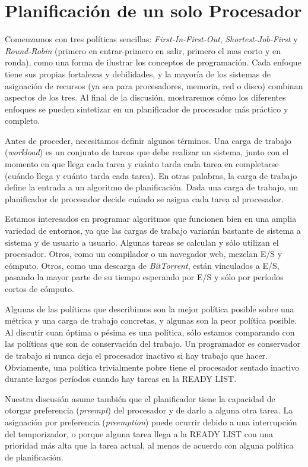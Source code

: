 \documentclass[10pt]{book}
\begin{document}
\section{Planificación de un solo Procesador}
Comenzamos con tres políticas sencillas: \textit{First-In-First-Out}, \textit{Shortest-Job-First} y \textit{Round-Robin} (primero en entrar-primero en salir, primero el mas corto y en ronda), como una forma de ilustrar los conceptos de programación. Cada enfoque tiene sus propias fortalezas y debilidades, y la mayoría de los sistemas de asignación de recursos (ya sea para procesadores, memoria, red o disco) combinan aspectos de los tres. Al final de la discusión, mostraremos cómo los diferentes enfoques se pueden sintetizar en un planificador de procesador más práctico y completo.

Antes de proceder, necesitamos definir algunos términos. Una carga de trabajo (\textit{workload}) es un conjunto de tareas que debe realizar un sistema, junto con el momento en que llega cada tarea y cuánto tarda cada tarea en completarse (cuándo llega y cuánto tarda cada tarea). En otras palabras, la carga de trabajo define la entrada a un algoritmo de planificación. Dada una carga de trabajo, un planificador de procesador decide cuándo se asigna cada tarea al procesador.

Estamos interesados en programar algoritmos que funcionen bien en una amplia variedad de entornos, ya que las cargas de trabajo variarán bastante de sistema a sistema y de usuario a usuario. Algunas tareas se calculan y sólo utilizan el procesador. Otros, como un compilador o un navegador web, mezclan E/S y cómputo. Otros, como una descarga de \textit{BitTorrent}, están vinculados a E/S, pasando la mayor parte de su tiempo esperando por E/S y sólo por períodos cortos de cómputo. 

Algunas de las políticas que describimos son la mejor política posible sobre una métrica y una carga de trabajo concretas, y algunas son la peor política posible. Al discutir cuan óptima o pésima es una política, sólo estamos comparando con las políticas que son de conservación del trabajo. Un programador es conservador de trabajo si nunca deja el procesador inactivo si hay trabajo que hacer. Obviamente, una política trivialmente pobre tiene el procesador sentado inactivo durante largos períodos cuando hay tareas en la READY LIST.

Nuestra discusión asume también que el planificador tiene la capacidad de otorgar preferencia (\textit{preempt}) del procesador y de darlo a alguna otra tarea. La asignación por preferencia (\textit{preemption}) puede ocurrir debido a una interrupción del temporizador, o porque alguna tarea llega a la READY LIST con una prioridad más alta que la tarea actual, al menos de acuerdo con alguna política de planificación.
\end{document}

